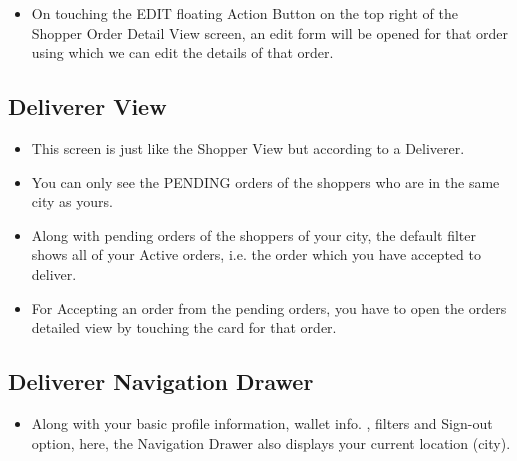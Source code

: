 \documentclass{report}
\begin{document}
\begin{itemize}
\item On touching the EDIT floating Action Button on the top right of the Shopper Order Detail View screen, an edit form will be opened for that order using which we can edit the details of that order.
\end{itemize}

\subsection{Deliverer View}
\begin{itemize}
\item This screen is just like the Shopper View but according to a Deliverer.
\item You can only see the PENDING orders of the shoppers who are in the same city as yours.
\item Along with pending orders of the shoppers of your city, the default filter shows all of your Active orders, i.e. the order which you have accepted to deliver.
\item For Accepting an order from the pending orders, you have to open the order\textquotesingle s detailed view by touching the card for that order.
\end{itemize}

\subsection{Deliverer Navigation Drawer}
\begin{itemize}
\item Along with your basic profile information, wallet info. , filters and Sign-out option, here, the Navigation Drawer also displays your current location (city).
\end{itemize}
\end{document}

